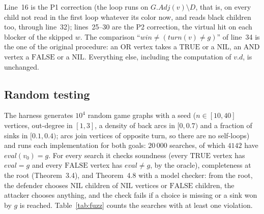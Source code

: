 \documentclass{article}
\theoremstyle{plain}
\theoremstyle{definition}
\theoremstyle{remark}
\newcommand{\Adj}{\mathit{Adj}}
\newcommand{\eval}{\mathit{eval}}
\newcommand{\turn}{\mathit{turn}}
\newcommand{\TRUE}{\ensuremath{\mathrm{TRUE}}}
\newcommand{\FALSE}{\ensuremath{\mathrm{FALSE}}}
\newcommand{\NIL}{\ensuremath{\mathrm{NIL}}}
\begin{document}
Line~16 is the P1 correction (the loop runs on $G.\Adj(v) \setminus D$, that is, on every child not read in the first loop whatever its color now, and reads black children too, through line~32); lines~25--30 are the P2 correction, the virtual hit on each blocker of the skipped $w$. The comparison ``$\mathit{win} \neq (\turn(v) \neq g)$'' of line~34 is the one of the original procedure: an OR vertex takes a \TRUE{} or a \NIL{}, an AND vertex a \FALSE{} or a \NIL{}. Everything else, including the computation of $v.d$, is unchanged.

\subsection{Random testing}\label{sec:fuzz}

The harness generates $10^4$ random game graphs with a seed ($n \in [10, 40]$ vertices, out-degree in $[1, 3]$, a density of back arcs in $[0, 0.7)$ and a fraction of sinks in $[0.1, 0.4)$; arcs join vertices of opposite turn, so there are no self-loops) and runs each implementation for both goals: $20\,000$ searches, of which $4142$ have $\eval(v_0) = g$. For every search it checks soundness (every \TRUE{} vertex has $\eval = g$ and every \FALSE{} vertex has $\eval \neq g$, by the oracle), completeness at the root (Theorem~3.4), and Theorem~4.8 with a model checker: from the root, the defender chooses \NIL{} children of \NIL{} vertices or \FALSE{} children, the attacker chooses anything, and the check fails if a choice is missing or a sink won by $g$ is reached. Table~\ref{tab:fuzz} counts the searches with at least one violation.
\end{document}
